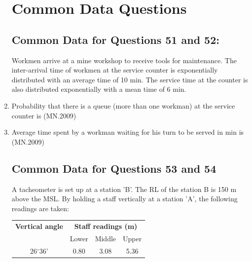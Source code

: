 \documentclass[journal]{IEEEtran}
\numberwithin{equation}{enumi}
\numberwithin{figure}{enumi}
\begin{document}
\begin{enumerate}
\section*{Common Data Questions}

\subsection*{Common Data for Questions 51 and 52:}

Workmen arrive at a mine workshop to receive tools for maintenance. The inter-arrival time of workmen at the service counter is exponentially distributed with an average time of 10 min. The service time at the counter is also distributed exponentially with a mean time of 6 min.

\item Probability that there is a queue (more than one workman) at the service counter is
 \hfill{(MN.2009)}
\begin{enumerate}[label=(\Alph*)]
\end{enumerate}

\item Average time spent by a workman waiting for his turn to be served in min is  \hfill{(MN.2009)}
\begin{enumerate}[label=(\Alph*)]
\end{enumerate}

\subsection*{Common Data for Questions 53 and 54}

A tacheometer is set up at a station 'B'. The RL of the station B is 150 m above the MSL. By holding a staff vertically at a station 'A', the following readings are taken:

\begin{center}
\begin{tabular}{|c|c|c|c|}
\hline
\textbf{Vertical angle} & \multicolumn{3}{c|}{\textbf{Staff readings (m)}} \\
\cline{2-4}
 & Lower & Middle & Upper \\
\hline
26$^\circ$36' & 0.80 & 3.08 & 5.36 \\
\hline
\end{tabular}
\end{center}


\end{enumerate}
\end{document}
